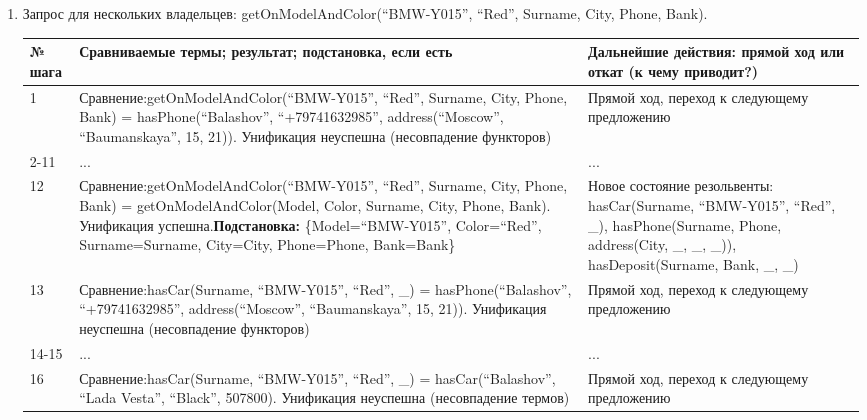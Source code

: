 \documentclass[14pt,a4paper]{scrreprt}
\begin{document}
\begin{enumerate}
	\item Запрос для нескольких владельцев: getOnModelAndColor(``BMW-Y015'', ``Red'', Surname, City, Phone, Bank).

\begin{table}[H]
	\centering
	\begin{tabular}{|p{1.2cm\small}|p{9cm\small}|p{5cm\small}|}
		\hline
		№ шага & Сравниваемые термы; результат; подстановка, если есть & Дальнейшие действия: прямой ход или откат (к чему приводит?)\\
		\hline
		1 & Сравнение:\linebreak getOnModelAndColor(``BMW-Y015'', ``Red'', Surname, City, Phone, Bank) = hasPhone(``Balashov'', ``+79741632985'', address(``Moscow'', ``Baumanskaya'', 15, 21)). Унификация неуспешна (несовпадение функторов) & Прямой ход, переход к следующему предложению\\
		\hline
		2-11 & ... & ...\\
		\hline
		12 & Сравнение:\linebreak getOnModelAndColor(``BMW-Y015'', ``Red'', Surname, City, Phone, Bank) = getOnModelAndColor(Model, Color, Surname, City, Phone, Bank). Унификация успешна.\linebreak \textbf{Подстановка:} \{Model=``BMW-Y015'', Color=``Red'', Surname=Surname, City=City, Phone=Phone, Bank=Bank\} & Новое состояние резольвенты: hasCar(Surname, ``BMW-Y015'', ``Red'', \_), hasPhone(Surname, Phone, address(City, \_, \_, \_)), hasDeposit(Surname, Bank, \_, \_)\\
		\hline 
		13 & Сравнение:\linebreak hasCar(Surname, ``BMW-Y015'', ``Red'', \_) = hasPhone(``Balashov'', ``+79741632985'', address(``Moscow'', ``Baumanskaya'', 15, 21)). Унификация неуспешна (несовпадение функторов) & Прямой ход, переход к следующему предложению\\
		\hline
		14-15 & ... & ...\\
		\hline
		16 & Сравнение:\linebreak hasCar(Surname, ``BMW-Y015'', ``Red'', \_) = hasCar(``Balashov'', ``Lada Vesta'', ``Black'', 507800). Унификация неуспешна (несовпадение термов) & Прямой ход, переход к следующему предложению\\
		\hline
	\end{tabular}
\end{table}


\end{enumerate}
\end{document}
